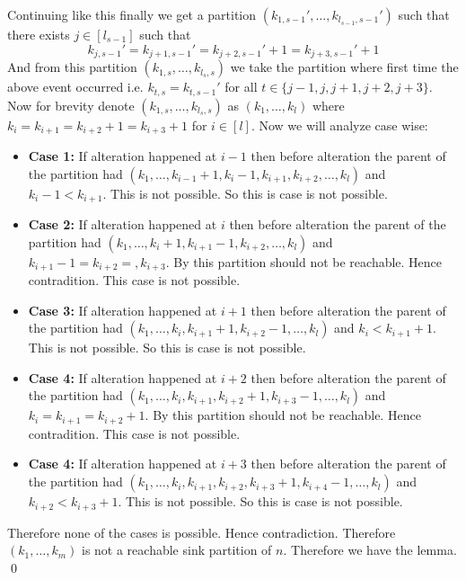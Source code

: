 \documentclass[a4paper, 11pt]{article}
\renewenvironment{proof}{\noindent{\it \textbf{Proof:}}\hspace*{1em}}{\hfill\qed\bigskip\\}
\begin{document}
{\begin{proof}
	Continuing like this finally we get a partition $(k_{1,s-1}',\dots, k_{l_{s-1},s-1}')$ such that there exists $j\in [l_{s-1}]$ such that $$k_{j,s-1}'=k_{j+1,s-1}'=k_{j+2,s-1}'+1=k_{j+3,s-1}'+1$$And from this partition $(k_{1,s},\dots, k_{l_s,s})$ we take the partition where first time the above event occurred i.e. $k_{t,s}=k_{t,s-1}'$ for all $t\in\{j-1,j,j+1,j+2,j+3\}$. Now for brevity denote $(k_{1,s},\dots, k_{l_s,s})$ as $(k_1,\dots, k_l)$ where $k_{i}=k_{i+1}=k_{i+2}+1=k_{i+3}+1$ for $i\in [l]$. Now we will analyze case wise:
	\begin{itemize}
		\item \textbf{Case 1:} If alteration happened at $i-1$ then before alteration the parent of the partition had $(k_1,\dots, k_{i-1}+1,k_i-1,k_{i+1},k_{i+2},\dots, k_l)$ and $k_{i}-1<k_{i+1}$. This is not possible. So this is case is not possible.
		\item \textbf{Case 2:} If alteration happened at $i$ then before alteration the parent of the partition had $(k_1,\dots, k_{i}+1,k_{i+1}-1,k_{i+2},\dots, k_l)$ and $k_{i+1}-1=k_{i+2}=,k_{i+3}$. By  this partition should not be reachable. Hence contradition. This case is not possible.
		\item \textbf{Case 3:} If alteration happened at $i+1$ then before alteration the parent of the partition had $(k_1,\dots,k_i,k_{i+1}+1,k_{i+2}-1,\dots, k_l)$ and $k_{i}<k_{i+1}+1$. This is not possible. So this is case is not possible.
		\item \textbf{Case 4:} If alteration happened at $i+2$ then before alteration the parent of the partition had $(k_1,\dots,k_i,k_{i+1},k_{i+2}+1,k_{i+3}-1,\dots, k_l)$ and $k_i=k_{i+1}=k_{i+2}+1$. By  this partition should not be reachable. Hence contradition. This case is not possible.
		\item \textbf{Case 4:} If alteration happened at $i+3$ then before alteration the parent of the partition had $(k_1,\dots,k_i,k_{i+1},k_{i+2},k_{i+3}+1,k_{i+4}-1,\dots, k_l)$ and $k_{i+2}<k_{i+3}+1$. This is not possible. So this is case is not possible.
	\end{itemize}Therefore none of the cases is possible. Hence contradiction. Therefore $(k_1,\dots, k_m)$ is not a reachable sink partition of $n$. Therefore we have the lemma.	
\end{proof}

}
\end{document}
